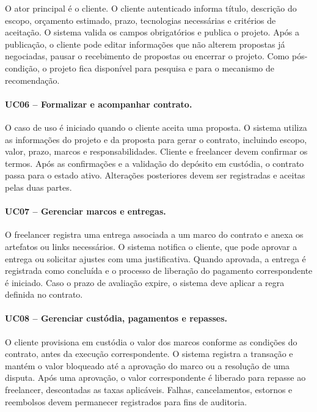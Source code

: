 \documentclass[portuguese]{sbcreviews-2025}
\begin{document}
O ator principal é o cliente. O cliente autenticado informa título,
descrição do escopo, orçamento estimado, prazo, tecnologias
necessárias e critérios de aceitação. O sistema valida os campos
obrigatórios e publica o projeto. Após a publicação, o cliente pode
editar informações que não alterem propostas já negociadas, pausar
o recebimento de propostas ou encerrar o projeto. Como pós-condição,
o projeto fica disponível para pesquisa e para o mecanismo de
recomendação.

\paragraph{UC06 -- Formalizar e acompanhar contrato.}

O caso de uso é iniciado quando o cliente aceita uma proposta. O
sistema utiliza as informações do projeto e da proposta para gerar
o contrato, incluindo escopo, valor, prazo, marcos e
responsabilidades. Cliente e freelancer devem confirmar os termos.
Após as confirmações e a validação do depósito em custódia, o
contrato passa para o estado ativo. Alterações posteriores devem ser
registradas e aceitas pelas duas partes.

\paragraph{UC07 -- Gerenciar marcos e entregas.}

O freelancer registra uma entrega associada a um marco do contrato
e anexa os artefatos ou links necessários. O sistema notifica o
cliente, que pode aprovar a entrega ou solicitar ajustes com uma
justificativa. Quando aprovada, a entrega é registrada como concluída
e o processo de liberação do pagamento correspondente é iniciado.
Caso o prazo de avaliação expire, o sistema deve aplicar a regra
definida no contrato.

\paragraph{UC08 -- Gerenciar custódia, pagamentos e repasses.}

O cliente provisiona em custódia o valor dos marcos conforme
as condições do contrato, antes da execução correspondente. O sistema registra a transação e mantém o valor bloqueado
até a aprovação do marco ou a resolução de uma disputa. Após uma aprovação, o valor
correspondente é liberado para repasse ao freelancer, descontadas as
taxas aplicáveis. Falhas, cancelamentos, estornos e reembolsos devem
permanecer registrados para fins de auditoria.
\end{document}
